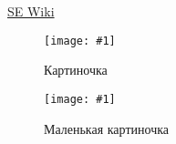\documentclass[12pt]{article}
\newcommand{\javacode}[1]{
  \lstset{style=java-style}
  
}
\newcommand{\xmlcode}[1]{
  \lstset{style=xml-style}
  
}
\newcommand{\image}[2]{
  \begin{figure}[H]
   \centering
    \texttt{[image: \#1]}
   \caption{#2}
  \end{figure}
}
\begin{document}
\href{http://mit.spbau.ru/sewiki/index.php/SE_Wiki}{SE Wiki}

\image{example/studio_example.png}{Картиночка}
\image{example/viewgroup.png}{Маленькая картиночка}

\javacode{example/example.java}

\pagebreak

\xmlcode{example/example.xml}
\end{document}
